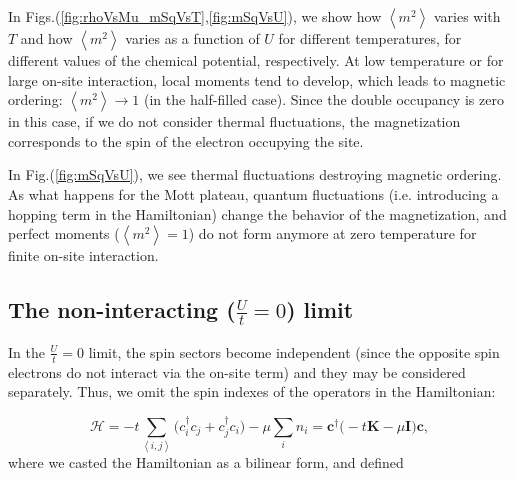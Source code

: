 In Figs.(\ref{fig:rhoVsMu_mSqVsT},\ref{fig:mSqVsU}), we show how $\left\langle m^2 \right\rangle$ varies with $T$ and how $\left\langle m^2 \right\rangle$ varies as a function of $U$ for different temperatures, for different values of the chemical potential, respectively.
At low temperature or for large on-site interaction, local moments tend to develop, which leads to magnetic ordering: $\left\langle m^2 \right\rangle \rightarrow 1$ (in the half-filled case).
Since the double occupancy is zero in this case, if we do not consider thermal fluctuations, the magnetization corresponds to the spin of the electron occupying the site.

In Fig.(\ref{fig:mSqVsU}), we see thermal fluctuations destroying magnetic ordering.
As what happens for the Mott plateau, quantum fluctuations (i.e. introducing a hopping term in the Hamiltonian) change the behavior of the magnetization, and perfect moments ($\left\langle m^2 \right\rangle =1$) do not form anymore at zero temperature for finite on-site interaction.

\subsection{The non-interacting ($\frac{U}{t} = 0$) limit}

In the $\frac{U}{t} = 0$ limit, the spin sectors become independent (since the opposite spin electrons do not interact via the on-site term) and they may be considered separately.
Thus, we omit the spin indexes of the operators in the Hamiltonian:

\begin{equation}
\mathcal{H} = -t \sum_{\left\langle i, j \right\rangle} \bigg( c_i^\dagger c_j + c_j^\dagger c_i \bigg) - \mu \sum_i n_i = \bm c^\dagger \bigg( -t \bm K - \mu \bm I \bigg) \bm c ,
\end{equation}
where we casted the Hamiltonian as a bilinear form, and defined

